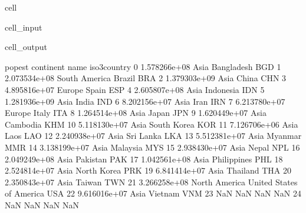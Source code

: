 \documentclass[letterpaper,10pt,english]{jupyterBook}
\begin{document}
\begin{sphinxuseclass}{cell}\begin{sphinxVerbatimInput}

\begin{sphinxuseclass}{cell_input}
\begin{sphinxVerbatim}[commandchars=\\\{\}]
\end{sphinxVerbatim}

\end{sphinxuseclass}\end{sphinxVerbatimInput}
\begin{sphinxVerbatimOutput}

\begin{sphinxuseclass}{cell_output}
\begin{sphinxVerbatim}[commandchars=\\\{\}]
         pop\PYGZus{}est      continent                      name iso3\PYGZus{}country  \PYGZbs{}
0   1.578266e+08           Asia                Bangladesh          BGD   
1   2.073534e+08  South America                    Brazil          BRA   
2   1.379303e+09           Asia                     China          CHN   
3   4.895816e+07         Europe                     Spain          ESP   
4   2.605807e+08           Asia                 Indonesia          IDN   
5   1.281936e+09           Asia                     India          IND   
6   8.202156e+07           Asia                      Iran          IRN   
7   6.213780e+07         Europe                     Italy          ITA   
8   1.264514e+08           Asia                     Japan          JPN   
9   1.620449e+07           Asia                  Cambodia          KHM   
10  5.118130e+07           Asia               South Korea          KOR   
11  7.126706e+06           Asia                      Laos          LAO   
12  2.240938e+07           Asia                 Sri Lanka          LKA   
13  5.512381e+07           Asia                   Myanmar          MMR   
14  3.138199e+07           Asia                  Malaysia          MYS   
15  2.938430e+07           Asia                     Nepal          NPL   
16  2.049249e+08           Asia                  Pakistan          PAK   
17  1.042561e+08           Asia               Philippines          PHL   
18  2.524814e+07           Asia               North Korea          PRK   
19  6.841414e+07           Asia                  Thailand          THA   
20  2.350843e+07           Asia                    Taiwan          TWN   
21  3.266258e+08  North America  United States of America          USA   
22  9.616016e+07           Asia                   Vietnam          VNM   
23           NaN            NaN                       NaN          NaN   
24           NaN            NaN                       NaN          NaN   


\end{sphinxVerbatim}
\end{sphinxuseclass}
\end{sphinxVerbatimOutput}
\end{sphinxuseclass}
\end{document}
